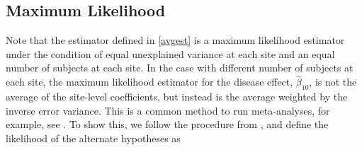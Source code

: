 \subsection{Maximum Likelihood}
Note that the estimator defined in \ref{avgest} is a maximum likelihood estimator under the condition of equal unexplained variance at each site and an equal number of subjects at each site. In the case with different number of subjects at each site, the maximum likelihood estimator for the disease effect, $\hat{\beta}_{10}$, is not the average of the site-level coefficients, but instead is the average weighted by the inverse error variance. This is a common method to run meta-analyses, for example, see \cite{enigmarandom,thompson2014enigma}. To show this, we follow the procedure from \cite{enigmarandom}, and define the likelihood of the alternate hypotheses as